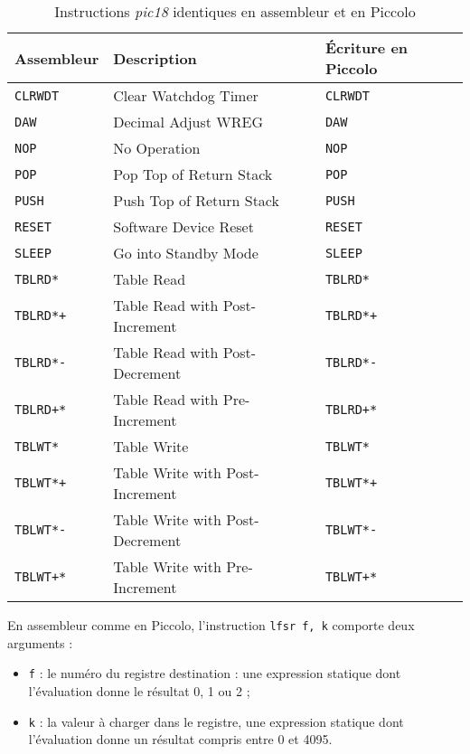 \begin{table}[!ht]
  \centering
  \small
  \begin{tabular}{lll}
    \textbf{Assembleur} & \textbf{Description} & \textbf{Écriture en Piccolo}\\
    \hline
    \texttt{CLRWDT} & Clear Watchdog Timer & \texttt{CLRWDT}\\
    \texttt{DAW} & Decimal Adjust WREG & \texttt{DAW}\\
    \texttt{NOP} & No Operation & \texttt{NOP}\\
    \texttt{POP} & Pop Top of Return Stack & \texttt{POP} \\
    \texttt{PUSH} & Push Top of Return Stack & \texttt{PUSH}\\
    \texttt{RESET} & Software Device Reset & \texttt{RESET} \\
    \texttt{SLEEP} & Go into Standby Mode & \texttt{SLEEP}\\
    \texttt{TBLRD*} & Table Read & \texttt{TBLRD*} \\
    \texttt{TBLRD*+} & Table Read with Post-Increment & \texttt{TBLRD*+} \\
    \texttt{TBLRD*-} & Table Read with Post-Decrement & \texttt{TBLRD*-} \\
    \texttt{TBLRD+*} & Table Read with Pre-Increment & \texttt{TBLRD+*} \\
    \texttt{TBLWT*} & Table Write & \texttt{TBLWT*} \\
    \texttt{TBLWT*+} & Table Write with Post-Increment & \texttt{TBLWT*+} \\
    \texttt{TBLWT*-} & Table Write with Post-Decrement & \texttt{TBLWT*-} \\
    \texttt{TBLWT+*} & Table Write with Pre-Increment & \texttt{TBLWT+*} \\
    \hline
  \end{tabular}
  \caption{Instructions \emph{pic18} identiques en assembleur et en Piccolo}
\end{table}



En assembleur comme en Piccolo, l'instruction \texttt{lfsr f, k} comporte deux arguments :
\begin{itemize}
  \item \texttt{f} : le numéro du registre destination : une expression statique dont l’évaluation donne le résultat 0, 1 ou 2 ;
  \item \texttt{k} : la valeur à charger dans le registre, une expression statique dont l’évaluation donne un résultat compris entre 0 et 4095.
\end{itemize}

